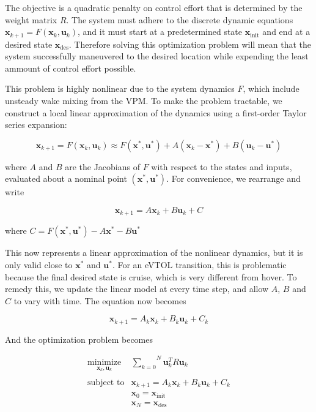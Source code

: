 \documentclass[12pt, letterpaper]{article}
\begin{document}
The objective is a quadratic penalty on control effort that is determined by the weight matrix $R$.  The system must adhere to the discrete dynamic equations $\mathbf{x}_{k+1} = F(\mathbf{x}_k, \mathbf{u}_k)$, and it must start at a predetermined state $\mathbf{x}_{\text{init}}$ and end at a desired state $\mathbf{x}_{\text{des}}$.  Therefore solving this optimization problem will mean that the system successfully maneuvered to the desired location while expending the least ammount of control effort possible. 

This problem is highly nonlinear due to the system dynamics $F$, which include unsteady wake mixing from the VPM. To make the problem tractable, we construct a local linear approximation of the dynamics using a first-order Taylor series expansion:  

\begin{equation}
\label{eq:taylor_series}
    \mathbf{x}_{k+1} = F(\mathbf{x}_k,\mathbf{u}_k) \approx F(\mathbf{x}^*,\mathbf{u}^*) + A (\mathbf{x}_k - \mathbf{x}^*) + B (\mathbf{u}_k - \mathbf{u}^*)
\end{equation}

where $A$ and $B$ are the Jacobians of $F$ with respect to the states and inputs, evaluated about a nominal point $(\mathbf{x}^*, \mathbf{u}^*)$.  For convenience, we rearrange and write


\begin{equation}
\label{eq:taylor_series}
    \mathbf{x}_{k+1} = A \mathbf{x}_k + B \mathbf{u}_k + C
\end{equation}

where $C = F(\mathbf{x}^*, \mathbf{u}^*) - A \mathbf{x}^* - B \mathbf{u}^*$

This now represents a linear approximation of the nonlinear dynamics, but it is only valid close to $\mathbf{x}^*$ and $\mathbf{u}^*$.  For an eVTOL transition, this is problematic because the final desired state is cruise, which is very different from hover.  To remedy this, we update the linear model at every time step, and allow $A$, $B$ and $C$ to vary with time.  The equation now becomes


\begin{equation}
\label{eq:taylor_series}
    \mathbf{x}_{k+1} = A_k \mathbf{x}_k + B_k \mathbf{u}_k + C_k
\end{equation}

And the optimization problem becomes


\begin{equation}
    \label{eq:LQR}
    \begin{matrix}
        \underset{\mathbf{x}_k, \mathbf{u}_k}{\text{minimize}} & \overset{N}{\underset{k=0}{\sum}} \mathbf{u}_k^T R \mathbf{u}_k \\ \\ 
        \text{subject to} & \mathbf{x}_{k+1} = A_k \mathbf{x}_k + B_k \mathbf{u}_k + C_k\\
        & \mathbf{x}_0 = \mathbf{x}_{\text{init}} \\ 
        & \mathbf{x}_N = \mathbf{x}_{\text{des}}
    \end{matrix}
\end{equation}
\end{document}
